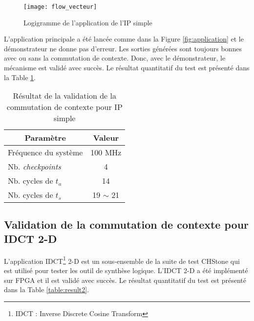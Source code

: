 \begin{figure}[h]
	\centering
	\texttt{[image: flow\_vecteur]}
	\caption{Logigramme de l'application de l'IP simple}
	\label{fig:flow_vecteur}
	\vspace{-2mm}
\end{figure}

L'application principale a été lancée comme dans la Figure \ref{fig:application} et le démonstrateur ne donne pas
d'erreur. Les sorties générées sont toujours bonnes avec ou sans la commutation de contexte. Donc, avec le
démonstrateur, le mécanisme est validé avec succès.
Le résultat quantitatif du test est présenté dans la Table \ref{table:result1}.

\begin{table}[h]
	\caption{Résultat de la validation de la commutation de contexte pour IP simple}
 	\label{table:result1}
	\vspace{-2mm}
	\begin{center}
		\begin{tabular}{|l|c|}
			\hline
			\multicolumn{1}{|c|}{\cellcolor{black!30} \textbf{Paramètre}}   				& 	\multicolumn{1}{c|}{\cellcolor{black!30} \textbf{Valeur}} 	\\
			\hline
			Fréquence du système	&	100 MHz	\\
			Nb. \emph{checkpoints}	&	4 		\\
			Nb. cycles de $t_a$		&	14		\\
			Nb. cycles de $t_s$		&	19 $\sim$ 21 \\
			\hline
		\end{tabular}
	\end{center}
	\vspace{-5mm}
\end{table}

\subsection{Validation de la commutation de contexte pour IDCT 2-D}

L'application IDCT\footnote{IDCT : Inverse Discrete Cosine Transform} 2-D est un sous-ensemble de la suite de test CHStone
qui est utilisé pour tester les outil de synthèse logique\cite{Hara2009}. L'IDCT 2-D a été implémenté sur FPGA et
il est validé avec succès. Le résultat quantitatif du test est présenté dans la Table \ref{table:result2}.

